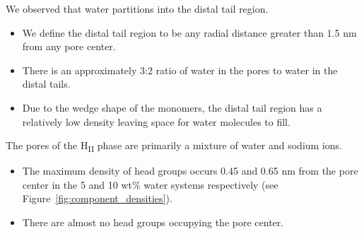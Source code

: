 \documentclass{article}
\begin{document}
  \noindent We observed that water partitions into the distal tail region.
  \begin{itemize}
    \item We define the distal tail region to be any radial distance 
    greater than 1.5 nm from any pore center. 
    \item There is an approximately 3:2 ratio of water in the pores to
    water in the distal tails. 
    \item Due to the wedge shape of the monomers, the distal tail region
    has a relatively low density leaving space for water molecules to 
    fill.  
  \end{itemize}
  
  \noindent The pores of the H\textsubscript{II} phase are primarily a 
  mixture of water and sodium ions.
  \begin{itemize}
    \item The maximum density of head groups occurs 0.45 and 0.65 nm from
    the pore center in the 5 and 10 wt\% water systems respectively (see
    Figure~\ref{fig:component_densities}). 
    \item There are almost no head groups occupying the pore center.
  \end{itemize}
  
\end{document}
